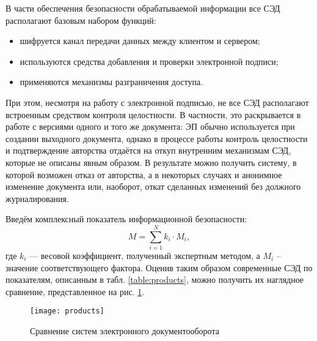 \vspace{\baselineskip}
В части обеспечения безопасности обрабатываемой информации все СЭД располагают базовым набором функций:
\begin{itemize}
  \item шифруется канал передачи данных между клиентом и сервером;
  \item используются средства добавления и проверки электронной подписи;
  \item применяются механизмы разграничения доступа.
\end{itemize}

При этом, несмотря на работу с электронной подписью, не все СЭД располагают встроенным средством контроля целостности. В частности, это раскрывается в работе с версиями одного и того же документа: ЭП обычно используется при создании выходного документа, однако в процессе работы контроль целостности и подтверждение авторства отдаётся на откуп внутренним механизмам СЭД, которые не описаны явным образом. В результате можно получить систему, в которой возможен отказ от авторства, а в некоторых случаях и анонимное изменение документа или, наоборот, откат сделанных изменений без должного журналирования.

\vspace{\baselineskip}
Введём комплексный показатель информационной безопасности:
\begin{equation}
  \label{eq:complex}
M = \sum_{i=1}^N k_i \cdot M_i,
\end{equation}
где $k_i$ --- весовой коэффициент, полученный экспертным методом, а $M_i$ -- значение соответствующего фактора.
Оценив таким образом современные СЭД по показателям, описанным в табл. \ref{table:products}, можно получить их наглядное сравнение, представленное на рис. \ref{img:products}.

\begin{figure}[h!]
  \centering
  \texttt{[image: products]}
  \caption{Сравнение систем электронного документооборота}
  \label{img:products}
\end{figure}

